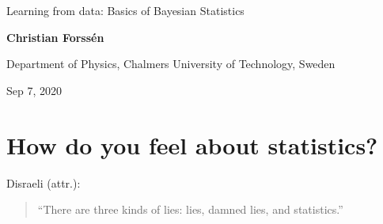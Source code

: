 \documentclass[%
oneside,                 %
final,                   %
10pt]{article}
\newenvironment{block_mdfboxadmon}[1][]{
\begin{block_mdfboxmdframed}[frametitle=#1]
}
{
\end{block_mdfboxmdframed}
}
\begin{document}

\newcommand{\exercisesection}[1]{\subsection*{#1}}







\thispagestyle{empty}

\begin{center}
{\LARGE\bf
\begin{spacing}{1.25}
Learning from data: Basics of Bayesian Statistics
\end{spacing}
}
\end{center}


\begin{center}
{\bf Christian Forssén}
\end{center}

    \begin{center}
\centerline{{\small Department of Physics, Chalmers University of Technology, Sweden}}
\end{center}
    

\begin{center}
Sep 7, 2020
\end{center}

\vspace{1cm}


\section{How do you feel about statistics?}

\begin{block_mdfboxadmon}[]
Disraeli (attr.): 

\begin{quote}
“There are three kinds of lies: lies, damned lies, and statistics.”
\end{quote}
\end{block_mdfboxadmon} %
\end{document}
